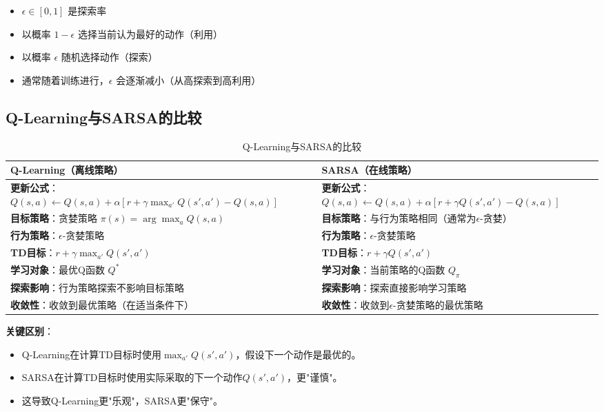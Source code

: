 \begin{itemize}
    \item $\epsilon \in [0, 1]$ 是探索率
    \item 以概率 $1-\epsilon$ 选择当前认为最好的动作（利用）
    \item 以概率 $\epsilon$ 随机选择动作（探索）
    \item 通常随着训练进行，$\epsilon$ 会逐渐减小（从高探索到高利用）
\end{itemize}

\subsection{Q-Learning与SARSA的比较}

\begin{table}[H]
\centering
\caption{Q-Learning与SARSA的比较}
\begin{tabular}{p{}p{}}
\toprule
\textbf{Q-Learning（离线策略）} & \textbf{SARSA（在线策略）} \\
\midrule
\textbf{更新公式}：$Q(s,a) \leftarrow Q(s,a) + \alpha[r + \gamma \max_{a'} Q(s',a') - Q(s,a)]$ & \textbf{更新公式}：$Q(s,a) \leftarrow Q(s,a) + \alpha[r + \gamma Q(s',a') - Q(s,a)]$ \\
\hline
\textbf{目标策略}：贪婪策略 $\pi(s) = \arg\max_{a} Q(s,a)$ & \textbf{目标策略}：与行为策略相同（通常为$\epsilon$-贪婪） \\
\hline
\textbf{行为策略}：$\epsilon$-贪婪策略 & \textbf{行为策略}：$\epsilon$-贪婪策略 \\
\hline
\textbf{TD目标}：$r + \gamma \max_{a'} Q(s',a')$ & \textbf{TD目标}：$r + \gamma Q(s',a')$ \\
\hline
\textbf{学习对象}：最优Q函数 $Q^*$ & \textbf{学习对象}：当前策略的Q函数 $Q_\pi$ \\
\hline
\textbf{探索影响}：行为策略探索不影响目标策略 & \textbf{探索影响}：探索直接影响学习策略 \\
\hline
\textbf{收敛性}：收敛到最优策略（在适当条件下） & \textbf{收敛性}：收敛到$\epsilon$-贪婪策略的最优策略 \\
\bottomrule
\end{tabular}
\end{table}

\textbf{关键区别}：
\begin{itemize}
    \item Q-Learning在计算TD目标时使用$\max_{a'} Q(s',a')$，假设下一个动作是最优的。
    \item SARSA在计算TD目标时使用实际采取的下一个动作$Q(s',a')$，更"谨慎"。
    \item 这导致Q-Learning更"乐观"，SARSA更"保守"。
\end{itemize}

